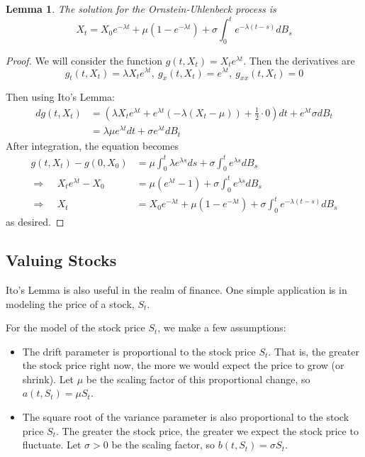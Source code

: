 \documentclass{article}
\newtheorem{lemma}[theorem]{Lemma}
\begin{document}
\begin{lemma}
The solution for the Ornstein-Uhlenbeck process is $$X_t = X_0e^{-\lambda t} + \mu\left( 1 - e^{-\lambda t}\right) + \sigma \int_0^t e^{-\lambda(t-s)}dB_s$$
\end{lemma}
\begin{proof}
We will consider the function $g(t,X_t) = X_t e^{\lambda t}$.  Then the derivatives are 
$$g_t(t,X_t) = \lambda X_t e^{\lambda t},\ g_x(t,X_t) = e^{\lambda t},\ g_{xx}(t,X_t) = 0$$

Then using Ito's Lemma:
\begin{align*}
dg(t,X_t) &= \left( \lambda X_t e^{\lambda t} + e^{\lambda t}\left(-\lambda(X_t-\mu)\right) + \frac12 \cdot 0 \right)dt + e^{\lambda t}\sigma dB_t \\
&= \lambda \mu e^{\lambda t} dt + \sigma e^{\lambda t} dB_t 
\end{align*}
After integration, the equation becomes
\begin{align*}
g(t,X_t) - g(0,X_0) &= \mu \int_0^t \lambda e^{\lambda s}ds + \sigma \int_0^t e^{\lambda s}dB_s \\
\Rightarrow \ \ \ \ \ X_t e^{\lambda t} - X_0 &= \mu\left( e^{\lambda t} - 1\right) + \sigma \int_0^t e^{\lambda s}dB_s \\
\Rightarrow \ \ \ \ \ X_t &= X_0 e^{-\lambda t} + \mu\left( 1 - e^{-\lambda t}\right) + \sigma \int_0^t e^{-\lambda(t-s)}dB_s
\end{align*}
as desired.

\end{proof}

\subsection{Valuing Stocks}
Ito's Lemma is also useful in the realm of finance.  One simple application is in modeling the price of a stock, $S_t$.  

For the model of the stock price $S_t$, we make a few assumptions: 
\begin{itemize}
\item The drift parameter is proportional to the  stock price $S_t$.  That is, the greater the stock price right now, the more we would expect the price to grow (or shrink).  Let $\mu$ be the scaling factor of this proportional change, so $a(t,S_t) = \mu S_t$.
\item The square root of the variance parameter is also proportional to the  stock price $S_t$.  The greater the  stock price, the greater we expect the stock price to fluctuate.  Let $\sigma>0$ be the scaling factor, so $b(t,S_t) = \sigma S_t$.
\end{itemize}
\end{document}
